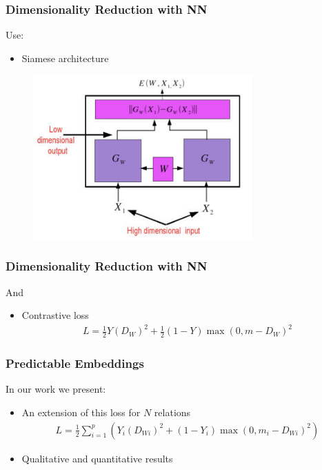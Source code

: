 \documentclass[10pt]{beamer}
\begin{document}
\begin{frame}
    \frametitle{Dimensionality Reduction with NN}
    Use:
    \begin{itemize}
        \item Siamese architecture %
    \end{itemize}

    \begin{figure}[h]
        \begin{center}
            \includegraphics[width=0.75\textwidth]{../report/thesis_figures/siamese_network.jpg}
        \end{center}
    \end{figure}
\end{frame}

\begin{frame}
    \frametitle{Dimensionality Reduction with NN}
    And
    \begin{itemize}
        \item Contrastive loss
            \begin{eqnarray}
                L = \frac{1}{2} Y (D_W)^2 + \frac{1}{2} (1-Y) \max(0, m - D_W)^2
            \end{eqnarray}
    \end{itemize}
\end{frame}

\begin{frame}
    \frametitle{Predictable Embeddings}
    In our work we present:
    \begin{itemize}
        \item An extension of this loss for $N$ relations
            \begin{eqnarray}
                L = \frac{1}{2} \sum_{i=1}^p \left( Y_i (D_{Wi})^2 + (1-Y_i) \max(0, m_i - D_{Wi})^2 \right)
            \end{eqnarray}
        \item Qualitative and quantitative results
    \end{itemize}
\end{frame}
\end{document}
